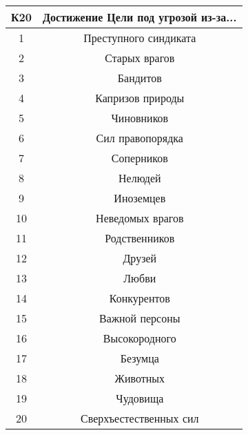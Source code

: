 \begin{center}
\begin{tabular}{ |c|c| }
\hline
\textbf{К20} & \textbf{Достижение Цели под угрозой из-за...} \\ \hline
1 & Преступного синдиката \\ \hline
2 & Старых врагов \\ \hline
3 & Бандитов \\ \hline
4 & Капризов природы \\ \hline
5 & Чиновников \\ \hline
6 & Сил правопорядка \\ \hline
7 & Соперников \\ \hline
8 & Нелюдей \\ \hline
9 & Иноземцев \\ \hline
10 & Неведомых врагов \\ \hline
11 & Родственников \\ \hline
12 & Друзей \\ \hline
13 & Любви \\ \hline
14 & Конкурентов \\ \hline
15 & Важной персоны \\ \hline
16 & Высокородного \\ \hline
17 & Безумца \\ \hline
18 & Животных \\ \hline
19 & Чудовища \\ \hline
20 & Сверхъестественных сил \\ \hline
\end{tabular}
\end{center}